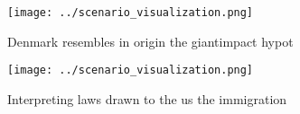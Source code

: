 \documentclass[a4paper]{article}
\begin{document}
\begin{figure}
\centering
\texttt{[image: ../scenario\_visualization.png]}
\caption{Denmark resembles in origin the giantimpact hypot
}
\end{figure}
 
\begin{figure}
\centering
\texttt{[image: ../scenario\_visualization.png]}
\caption{Interpreting laws drawn to the us the immigration
}
\end{figure}
 
\end{document}
